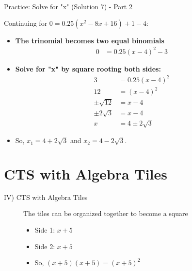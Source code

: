 \documentclass[aspectratio=169]{beamer}
\begin{document}
\begin{frame}{Practice: Solve for "x" (Solution 7) - Part 2}
    \begin{tcolorbox}[colback=lightgray,colframe=accent,title=Solution 7 - Part 2 (Cont.)]
        \footnotesize
        Continuing for $0 = 0.25(x^2 - 8x + 16) + 1 - 4$:
        \begin{itemize}
            \item \textbf{The trinomial becomes two equal binomials}
                \begin{align*}
                    0 &= 0.25(x-4)^2 - 3
                \end{align*}
            \item \textbf{Solve for "x" by square rooting both sides:}
                \begin{align*}
                    3 &= 0.25(x-4)^2 \\
                    12 &= (x-4)^2 \\
                    \pm\sqrt{12} &= x-4 \\
                    \pm 2\sqrt{3} &= x-4 \\
                    x &= 4 \pm 2\sqrt{3}
                \end{align*}
            \item So, $x_1 = 4 + 2\sqrt{3}$ and $x_2 = 4 - 2\sqrt{3}$.
        \end{itemize}
    \end{tcolorbox}
\end{frame}

\section{CTS with Algebra Tiles}

\begin{frame}{IV) CTS with Algebra Tiles}
    \begin{tcolorbox}[colback=lightgray,colframe=primary,title=Concept: $y = x^2 + 10x + 25$]
        \footnotesize
        \begin{figure}[H]
            \centering
            The tiles can be organized together to become a square
            
            \begin{itemize}
                \item Side 1: $x+5$
                \item Side 2: $x+5$
                \item So, $(x+5)(x+5) = (x+5)^2$
            \end{itemize}
        \end{figure}
    \end{tcolorbox}
\end{frame}
\end{document}
